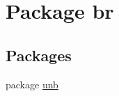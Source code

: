 \hypertarget{namespacebr}{}\section{Package br}
\label{namespacebr}
\subsection*{Packages}
\begin{DoxyCompactItemize}
\item 
package \mbox{\hyperlink{namespacebr_1_1unb}{unb}}
\end{DoxyCompactItemize}
